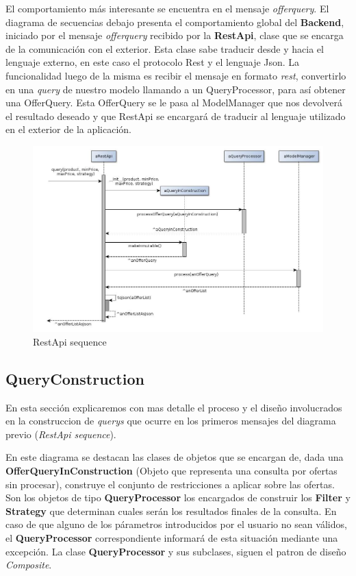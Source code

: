 \documentclass[10pt, a4paper]{article}
\begin{document}
El comportamiento m\'as interesante se encuentra en el mensaje \emph{offerquery}. El diagrama de secuencias debajo presenta el comportamiento global del \textbf{Backend}, iniciado por el mensaje \emph{offerquery} recibido por la \textbf{RestApi}, clase que se encarga de la comunicación con el exterior. Esta clase sabe traducir desde y hacia el lenguaje externo, en este caso el protocolo \textsf{Rest} y el lenguaje \textsf{Json}. La funcionalidad luego de la misma es recibir el mensaje en formato \emph{rest}, convertirlo en una \emph{query} de nuestro modelo llamando a un \textsf{QueryProcessor}, para así obtener una \textsf{OfferQuery}. Esta \textsf{OfferQuery} se le pasa al \textsf{ModelManager} que nos devolverá el resultado deseado y que \textsf{RestApi} se encargará de traducir al lenguaje utilizado en el exterior de la aplicación.
\begin{figure}[H]
\centering
\includegraphics[scale=0.5]{graphics/service_sequence.jpg}
\caption{RestApi sequence}
\end{figure}

\subsection{QueryConstruction}
En esta secci\'on explicaremos con mas detalle el proceso y el diseño involucrados en la construccion de \emph{querys} que ocurre en los primeros mensajes del diagrama previo (\emph{RestApi sequence}). 

En este diagrama se destacan las clases de objetos que se encargan de, dada una \textbf{OfferQueryInConstruction} (Objeto que representa una consulta por ofertas sin procesar), construye el conjunto de restricciones a aplicar sobre las ofertas. Son los objetos de tipo \textbf{QueryProcessor} los encargados de construir los \textbf{Filter} y \textbf{Strategy} que determinan cuales serán los resultados finales de la consulta. En caso de que alguno de los párametros introducidos por el usuario no sean válidos, el \textbf{QueryProcessor} correspondiente informará de esta situación mediante una excepción. La clase \textbf{QueryProcessor} y sus subclases, siguen el patron de diseño \emph{Composite}.
\end{document}
